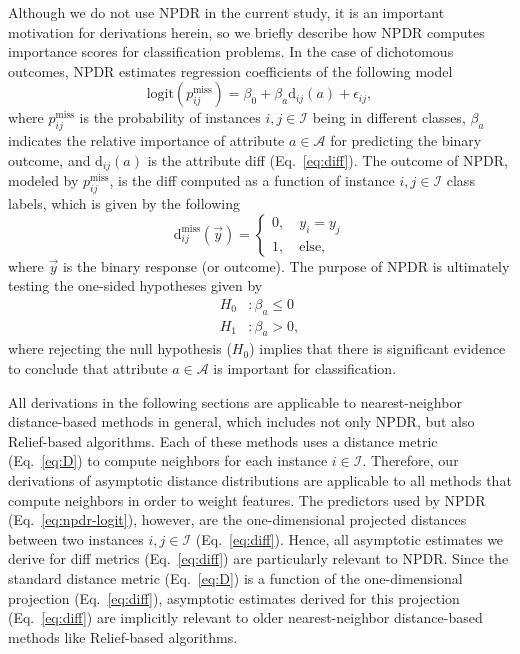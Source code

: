 \documentclass[10pt,letterpaper]{article}
\begin{document}
Although we do not use NPDR in the current study, it is an important motivation for derivations herein, so we briefly describe how NPDR computes importance scores for classification problems. In the case of dichotomous outcomes, NPDR estimates regression coefficients of the following model
%
\begin{equation}\label{eq:npdr-logit}
\text{logit}(p^\text{miss}_{ij}) = \beta_0 + \beta_a \text{d}_{ij}(a) + \epsilon_{ij},
\end{equation}
%
where $p^\text{miss}_{ij}$ is the probability of instances $i,j \in \mathcal{I}$ being in different classes, $\beta_a$ indicates the relative importance of attribute $a \in \mathcal{A}$ for predicting the binary outcome, and $\text{d}_{ij}(a)$ is the attribute diff (Eq.~\ref{eq:diff}). The outcome of NPDR, modeled by $p^\text{miss}_{ij}$, is the diff computed as a function of instance $i,j \in \mathcal{I}$ class labels, which is given by the following
%
\begin{equation}\label{eq:pheno-diff}
\text{d}^\text{miss}_{ij}(\overrightarrow{y})=
\begin{cases}
0, \quad y_i = y_j \\
1, \quad \text{else},
\end{cases}
\end{equation}
%
where $\overrightarrow{y}$ is the binary response (or outcome). The purpose of NPDR is ultimately testing the one-sided hypotheses given by
%
\begin{equation}
\begin{aligned}
H_0&: \beta_a \leq 0 \\
H_1&: \beta_a > 0,
\end{aligned}
\end{equation}
%
where rejecting the null hypothesis ($H_0$) implies that there is significant evidence to conclude that attribute $a \in \mathcal{A}$ is important for classification.

All derivations in the following sections are applicable to nearest-neighbor distance-based methods in general, which includes not only NPDR, but also Relief-based algorithms. Each of these methods uses a distance metric (Eq.~\ref{eq:D}) to compute neighbors for each instance $i \in \mathcal{I}$. Therefore, our derivations of asymptotic distance distributions are applicable to all methods that compute neighbors in order to weight features. The predictors used by NPDR (Eq.~\ref{eq:npdr-logit}), however, are the one-dimensional projected distances between two instances $i,j \in \mathcal{I}$ (Eq.~\ref{eq:diff}). Hence, all asymptotic estimates we derive for diff metrics (Eq.~\ref{eq:diff}) are particularly relevant to NPDR. Since the standard distance metric (Eq.~\ref{eq:D}) is a function of the one-dimensional projection (Eq.~\ref{eq:diff}), asymptotic estimates derived for this projection (Eq.~\ref{eq:diff}) are implicitly relevant to older nearest-neighbor distance-based methods like Relief-based algorithms. 
\end{document}
